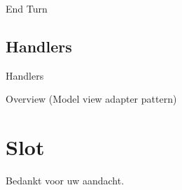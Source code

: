 \documentclass[11pt,t]{beamer}
\begin{document}
\begin{frame}{End Turn}
\end{frame}

\subsection{Handlers}

\begin{frame}{Handlers}
\end{frame}

\begin{frame}{Overview (Model view adapter pattern)}

\end{frame}
\section{Slot}
\begin{frame}
\vspace{1.5in}
\begin{center}
Bedankt voor uw aandacht.
\end{center}
\end{frame}
\end{document}
